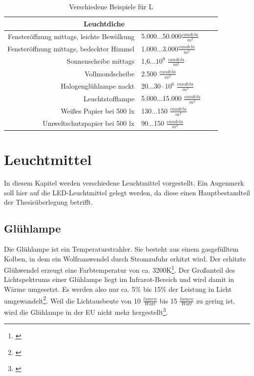 \begin{table}[htp] 
		\centering
		\begin{tabular}{rlcc}  %
		\toprule
		\multicolumn{2}{c}{\large\sffamily Leuchtdiche}\\ 							
		\midrule
		Fensteröffnung mittags, leichte Bewölkung & 5.000...50.000$\frac{candela}{m^{2}}$\\
		Fensteröffnung mittags, bedeckter Himmel & 1.000...3.000$\frac{candela}{m^{2}}$\\
		Sonnenscheibe mittags & 1,6...$10^{9}$ $\frac{candela}{m^{2}}$\\
		Vollmondscheibe & 2.500 $\frac{candela}{m^{2}}$\\
		Halogenglühlampe nackt & 20...$30 \cdot 10^{6}$ $\frac{candela}{m^{2}}$\\
		Leuchtstofflampe & 5.000...15.000 $\frac{candela}{m^{2}}$\\
		Weißes Papier bei 500 lx & 130...150 $\frac{candela}{m^{2}}$\\
		Umweltschutzpapier bei 500 lx & 90...150 $\frac{candela}{m^{2}}$\\
		\bottomrule
		\end{tabular}
		\caption{Verschiedene Beispiele für L\protect\footnotemark}	
		\label{t_candelamm}
	\end{table}


\chapter{Leuchtmittel}
In diesem Kapitel werden verschiedene Leuchtmittel vorgestellt. Ein Augenmerk soll hier auf die LED-Leuchtmittel gelegt werden, da diese einen Hauptbestandteil der Thesisüberlegung betrifft.


\section{Glühlampe} \label{sec_glühlampe}
Die Glühlampe ist ein Temperaturstrahler. Sie besteht aus einem gasgefülltem Kolben, in dem ein Wolframwendel durch Stromzufuhr erhitzt wird. Der erhitzte Glühwendel erzeugt eine Farbtemperatur von ca. 3200K\footnote{\cite[137]{mueller}}. Der Großanteil des Lichtspektrums einer Glühlampe liegt im Infrarot-Bereich und wird damit in Wärme umgesetzt. Es werden also nur ca. 5\% bis 15\% der Leistung in Licht umgewandelt\footnote{\cite[78]{ris}}.
Weil die Lichtausbeute von 10 $\frac{lumen}{Watt}$ bis 15 $\frac{lumen}{Watt}$ zu gering ist, wird die Glühlampe in der EU nicht mehr hergestellt\footnote{\cite[78]{ris}}.
 
